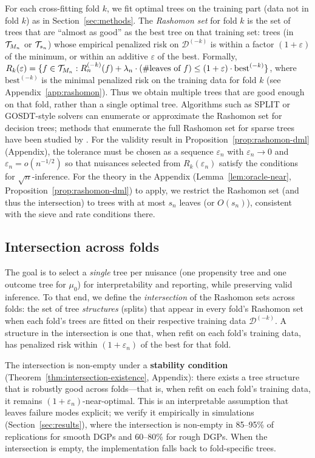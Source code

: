 \documentclass[12pt]{article}
\begin{document}
For each cross-fitting fold $k$, we fit optimal trees on the training part (data not in fold $k$) as in Section~\ref{sec:methods}. The \emph{Rashomon set} for fold $k$ is the set of trees that are ``almost as good'' as the best tree on that training set: trees (in $\mathcal{T}_{M_n}$ or $\mathcal{T}_{s_n}$) whose empirical penalized risk on $\mathcal{D}^{(-k)}$ is within a factor $(1+\varepsilon)$ of the minimum, or within an additive $\varepsilon$ of the best. Formally, $R_k(\varepsilon) = \{ f \in \mathcal{T}_{M_n} : R_n^{(-k)}(f) + \lambda_n \cdot (\#\text{leaves of } f) \le (1+\varepsilon) \cdot \text{best}^{(-k)} \}$, where $\text{best}^{(-k)}$ is the minimal penalized risk on the training data for fold $k$ (see Appendix~\ref{app:rashomon}). Thus we obtain multiple trees that are good enough on that fold, rather than a single optimal tree. Algorithms such as SPLIT \citep{babbarNearOptimalDecisionTrees2025} or GOSDT-style solvers can enumerate or approximate the Rashomon set for decision trees; methods that enumerate the full Rashomon set for sparse trees have been studied by \citet{xinExploringWholeRashomon2022}. For the validity result in Proposition~\ref{prop:rashomon-dml} (Appendix), the tolerance must be chosen as a sequence $\varepsilon_n$ with $\varepsilon_n \to 0$ and $\varepsilon_n = o(n^{-1/2})$ so that nuisances selected from $R_k(\varepsilon_n)$ satisfy the conditions for $\sqrt{n}$-inference. For the theory in the Appendix (Lemma~\ref{lem:oracle-near}, Proposition~\ref{prop:rashomon-dml}) to apply, we restrict the Rashomon set (and thus the intersection) to trees with at most $s_n$ leaves (or $O(s_n)$), consistent with the sieve and rate conditions there.

\subsection{Intersection across folds}

The goal is to select a \emph{single} tree per nuisance (one propensity tree and one outcome tree for $\mu_0$) for interpretability and reporting, while preserving valid inference. To that end, we define the \emph{intersection} of the Rashomon sets across folds: the set of tree \emph{structures} (splits) that appear in every fold's Rashomon set when each fold's trees are fitted on their respective training data $\mathcal{D}^{(-k)}$. A structure in the intersection is one that, when refit on each fold's training data, has penalized risk within $(1+\varepsilon_n)$ of the best for that fold.

The intersection is non-empty under a \textbf{stability condition} (Theorem~\ref{thm:intersection-existence}, Appendix): there exists a tree structure that is robustly good across folds---that is, when refit on each fold's training data, it remains $(1+\varepsilon_n)$-near-optimal. This is an interpretable assumption that leaves failure modes explicit; we verify it empirically in simulations (Section~\ref{sec:results}), where the intersection is non-empty in 85--95\% of replications for smooth DGPs and 60--80\% for rough DGPs. When the intersection is empty, the implementation falls back to fold-specific trees.
\end{document}
